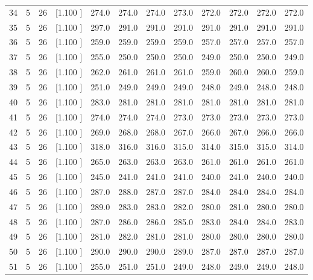 \documentclass[12pt,a4paper]{article}
\begin{document}
\begin{center}
{\begin{tabular}{r r r r r r r r r r r r}
  34&  5& 26&[1.100     ]&   274.0&   274.0&   274.0&   273.0&   272.0&   272.0&   272.0&   272.0\\[-0.02in]
  35&  5& 26&[1.100     ]&   297.0&   291.0&   291.0&   291.0&   291.0&   291.0&   291.0&   291.0\\[-0.02in]
  36&  5& 26&[1.100     ]&   259.0&   259.0&   259.0&   259.0&   257.0&   257.0&   257.0&   257.0\\[-0.02in]
  37&  5& 26&[1.100     ]&   255.0&   250.0&   250.0&   250.0&   249.0&   250.0&   250.0&   249.0\\[-0.02in]
  38&  5& 26&[1.100     ]&   262.0&   261.0&   261.0&   261.0&   259.0&   260.0&   260.0&   259.0\\[-0.02in]
  39&  5& 26&[1.100     ]&   251.0&   249.0&   249.0&   249.0&   248.0&   249.0&   248.0&   248.0\\[-0.02in]
  40&  5& 26&[1.100     ]&   283.0&   281.0&   281.0&   281.0&   281.0&   281.0&   281.0&   281.0\\[-0.02in]
  41&  5& 26&[1.100     ]&   274.0&   274.0&   274.0&   273.0&   273.0&   273.0&   273.0&   273.0\\[-0.02in]
  42&  5& 26&[1.100     ]&   269.0&   268.0&   268.0&   267.0&   266.0&   267.0&   266.0&   266.0\\[-0.02in]
  43&  5& 26&[1.100     ]&   318.0&   316.0&   316.0&   315.0&   314.0&   315.0&   315.0&   314.0\\[-0.02in]
  44&  5& 26&[1.100     ]&   265.0&   263.0&   263.0&   263.0&   261.0&   261.0&   261.0&   261.0\\[-0.02in]
  45&  5& 26&[1.100     ]&   245.0&   241.0&   241.0&   241.0&   240.0&   241.0&   240.0&   240.0\\[-0.02in]
  46&  5& 26&[1.100     ]&   287.0&   288.0&   287.0&   287.0&   284.0&   284.0&   284.0&   284.0\\[-0.02in]
  47&  5& 26&[1.100     ]&   289.0&   283.0&   283.0&   282.0&   280.0&   281.0&   280.0&   280.0\\[-0.02in]
  48&  5& 26&[1.100     ]&   287.0&   286.0&   286.0&   285.0&   283.0&   284.0&   284.0&   283.0\\[-0.02in]
  49&  5& 26&[1.100     ]&   281.0&   282.0&   281.0&   281.0&   280.0&   280.0&   280.0&   280.0\\[-0.02in]
  50&  5& 26&[1.100     ]&   290.0&   290.0&   290.0&   289.0&   287.0&   287.0&   287.0&   287.0\\[-0.02in]
  51&  5& 26&[1.100     ]&   255.0&   251.0&   251.0&   249.0&   248.0&   249.0&   249.0&   248.0\\[-0.02in]

\end{tabular}}
\end{center}
\end{document}
